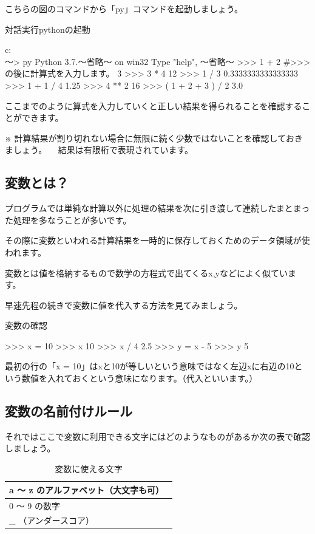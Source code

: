 \documentclass[11pt,a4paper,dvipdfmx,titlepage]{jsreport}
\begin{document}
こちらの図のコマンドから「py」コマンドを起動しましょう。

\begin{grabox}{対話実行pythonの起動}
\begin{listingcont}
c:\\～> py
Python 3.7.～省略～ on win32
Type "help", ～省略～
>>> 1 + 2 #>>>の後に計算式を入力します。
3
>>> 3 * 4
12
>>> 1 / 3
0.3333333333333333
>>> 1 +  1 / 4 
1.25
>>> 4 ** 2
16
>>> ( 1 + 2 + 3 ) / 2
3.0
\end{listingcont}
\end{grabox}

ここまでのように算式を入力していくと正しい結果を得られることを確認することができます。

※ 計算結果が割り切れない場合に無限に続く少数ではないことを確認しておきましょう。
　結果は有限桁で表現されています。

\subsection{変数とは？}

プログラムでは単純な計算以外に処理の結果を次に引き渡して連続したまとまった処理を多なうことが多いです。

その際に変数といわれる計算結果を一時的に保存しておくためのデータ領域が使われます。

 変数とは値を格納するもので数学の方程式で出てくるx,yなどによく似ています。

早速先程の続きで変数に値を代入する方法を見てみましょう。

\begin{grabox}{変数の確認}
\begin{listingcont}
>>> x = 10
>>> x
10
>>> x / 4
2.5
>>> y = x - 5
>>> y
5
\end{listingcont}
\end{grabox}
最初の行の「x = 10」はxと10が等しいという意味ではなく左辺xに右辺の10という数値を入れておくという意味になります。（代入といいます。）

\subsection{変数の名前付けルール}
それではここで変数に利用できる文字にはどのようなものがあるか次の表で確認しましょう。
\begin{table}[h]
 \begin{center}
    \caption{変数に使える文字}
\begin{tabular}{|p{10cm}|} \hline
a ～ z のアルファベット（大文字も可）　\\ \hline
0 〜 9 の数字 \\ \hline
\_ （アンダースコア） \\ \hline
\end{tabular}
\end{center}
\end{table}
\end{document}
